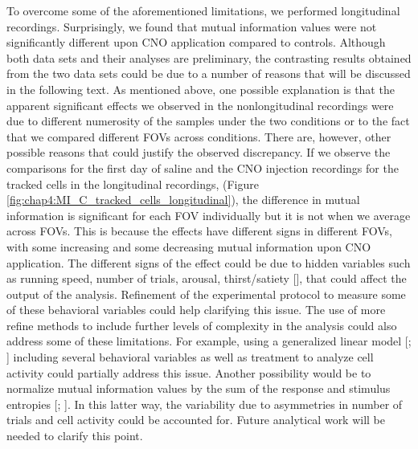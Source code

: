 To overcome some of the aforementioned limitations, we performed longitudinal recordings.
Surprisingly, we found that mutual information values were not significantly different upon CNO application compared to controls. 
Although both data sets and their analyses are preliminary, the contrasting results obtained from the two data sets could be due to a number of reasons that will be discussed in the following text. 
As mentioned above, one possible explanation is that the apparent significant effects we observed in the nonlongitudinal recordings were due to different numerosity of the samples under the two conditions or to the fact that we compared different FOVs across conditions. 
There are, however, other possible reasons that could justify the observed discrepancy. 
If we observe the comparisons for the first day of saline and the CNO injection recordings for the tracked cells in the longitudinal recordings, (Figure \ref{fig:chap4:MI_C_tracked_cells_longitudinal}), the difference in mutual information is significant for each FOV individually but it is not when we average across FOVs. 
This is because the effects have different signs in different FOVs, with some increasing and some decreasing mutual information upon CNO application.
The different signs of the effect could be due to hidden variables such as running speed, number of trials, arousal, thirst/satiety [\cite{allen2019thirst}], that could affect the output of the analysis. 
Refinement of the experimental protocol to measure some of these behavioral variables could help clarifying this issue.
The use of more refine methods to include further levels of complexity in the analysis could also address some of these limitations.
For example, using a generalized linear model [\cite{saleem2018coherent}; \cite{saleem2013integration}] including several behavioral variables as well as treatment to analyze cell activity could partially address this issue. 
Another possibility would be to normalize mutual information values by the sum of the response and stimulus entropies [\cite{kvaalseth2017normalized}; \cite{timme2018tutorial}]. 
In this latter way, the variability due to asymmetries in number of trials and cell activity could be accounted for.
Future analytical work will be needed to clarify this point.

